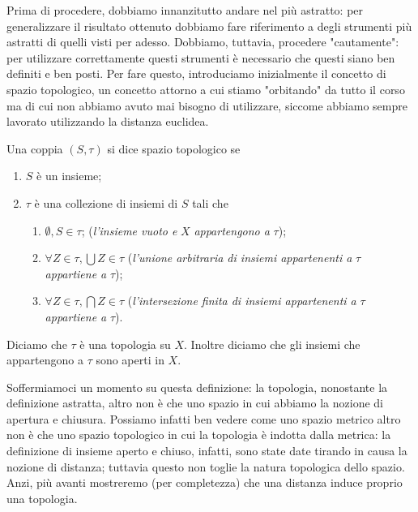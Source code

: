 Prima di procedere, dobbiamo innanzitutto andare nel più astratto: per generalizzare il risultato ottenuto dobbiamo fare riferimento a degli strumenti più astratti di quelli visti per adesso. Dobbiamo, tuttavia, procedere
"cautamente": per utilizzare correttamente questi strumenti è necessario che questi siano ben definiti e ben posti. Per fare questo, introduciamo inizialmente il concetto di spazio topologico, un concetto attorno a cui stiamo
"orbitando" da tutto il corso ma di cui non abbiamo avuto mai bisogno di utilizzare, siccome abbiamo sempre lavorato utilizzando la distanza euclidea. 
%
\vspace{0.5cm}
\begin{definition}[\textcolor{blue}{spazio topologico}]
    Una coppia $(S, \tau)$ si dice spazio topologico se
    \begin{enumerate}[label=\protect\circled{\arabic*}]
        \item $S$ è un insieme;
        \item $\tau$ è una collezione di insiemi di $S$ tali che
        \begin{enumerate}
            \item $\emptyset, S \in \tau$; (\emph{l'insieme vuoto e } $X$ \emph{ appartengono a } $\tau$);
            \item $\forall Z \in \tau, \bigcup Z \in \tau$ (\emph{l'unione arbitraria di insiemi appartenenti a } $\tau$ \emph{ appartiene a } $\tau$);
            \item $\forall Z \in \tau, \bigcap Z \in \tau$ (\emph{l'intersezione finita di insiemi appartenenti a } $\tau$ \emph{ appartiene a } $\tau$).
        \end{enumerate}
    \end{enumerate}
    Diciamo che $\tau$ è una topologia su $X$. Inoltre diciamo che gli insiemi che appartengono a $\tau$ sono aperti in $X$. 
    \label{def:topological_space}
\end{definition}
%
Soffermiamoci un momento su questa definizione: la topologia, nonostante la definizione astratta, altro non è che uno spazio in cui abbiamo la nozione di apertura e chiusura. Possiamo infatti ben vedere come uno spazio metrico
altro non è che uno spazio topologico in cui la topologia è indotta dalla metrica: la definizione di insieme aperto e chiuso, infatti, sono state date tirando in causa la nozione di distanza; tuttavia questo non toglie la natura
topologica dello spazio. Anzi, più avanti mostreremo (per completezza) che una distanza induce proprio una topologia. 
%
